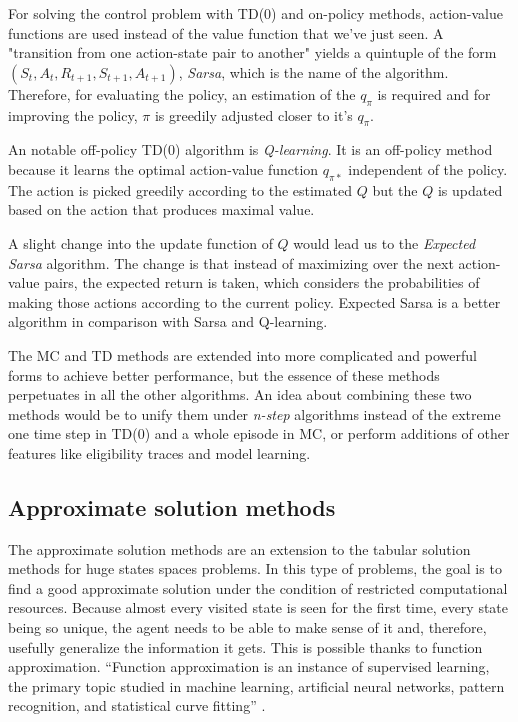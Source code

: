 For solving the control problem with TD(0) and on-policy methods, action-value functions are used instead of the value function that we've just seen. A "transition from one action-state pair to another" \cite{Sutton} yields a quintuple of the form $(S_{t}, A_{t}, R_{t+1}, S_{t+1}, A_{t+1})$, \textit{Sarsa}, which is the name of the algorithm. Therefore, for evaluating the policy, an estimation of the $q_{\pi}$ is required and for improving the policy, $\pi$ is greedily adjusted closer to it's $q_{\pi}$.

An notable off-policy TD(0) algorithm is \textit{Q-learning}. It is an off-policy method because it learns the optimal action-value function $q_{\pi*}$ independent of the policy. The action is picked greedily according to the estimated $Q$ but the $Q$ is updated based on the action that produces maximal value. 

A slight change into the update function of $Q$ would lead us to the \textit{Expected Sarsa} algorithm. The change is that instead of maximizing over the next action-value pairs, the expected return is taken, which considers the probabilities of making those actions according to the current policy. Expected Sarsa is a better algorithm in comparison with Sarsa and Q-learning.

The MC and TD methods are extended into more complicated and powerful forms to achieve better performance, but the essence of these methods perpetuates in all the other algorithms. An idea about combining these two methods would be to unify them under \textit{n-step} algorithms instead of the extreme one time step in TD(0) and a whole episode in MC, or perform additions of other features like eligibility traces and model learning.
	
\subsection{Approximate solution methods}
The approximate solution methods are an extension to the tabular solution methods for huge states spaces problems. In this type of problems, the goal is to find a good approximate solution under the condition of restricted computational resources. Because almost every visited state is seen for the first time, every state being so unique, the agent needs to be able to make sense of it and, therefore, usefully generalize the information it gets. This is possible thanks to function approximation. “Function approximation is an instance of supervised learning, the primary topic studied in machine learning, artificial neural networks, pattern recognition, and statistical curve fitting” \cite{Sutton}.

